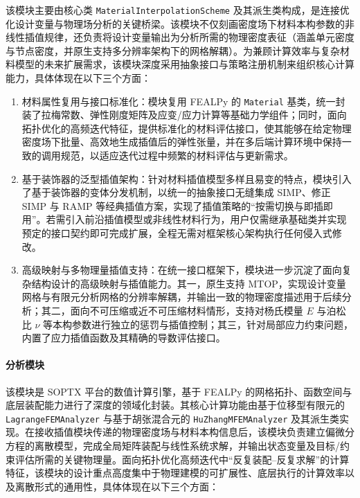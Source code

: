 该模块主要由核心类 \texttt{MaterialInterpolationScheme} 及其派生类构成，是连接优化设计变量与物理场分析的关键桥梁。该模块不仅刻画密度场下材料本构参数的非线性插值规律，还负责将设计变量输出为分析所需的物理密度表征（涵盖单元密度与节点密度，并原生支持多分辨率架构下的网格解耦）。为兼顾计算效率与复杂材料模型的未来扩展需求，该模块深度采用抽象接口与策略注册机制来组织核心计算能力，具体体现在以下三个方面：

\begin{enumerate}
	\item 材料属性复用与接口标准化：模块复用 FEALPy 的 \texttt{Material} 基类，统一封装了拉梅常数、弹性刚度矩阵及应变/应力计算等基础力学组件；同时，面向拓扑优化的高频迭代特征，提供标准化的材料评估接口，使其能够在给定物理密度场下批量、高效地生成插值后的弹性张量，并在多后端计算环境中保持一致的调用规范，以适应迭代过程中频繁的材料评估与更新需求。
	
	\item 基于装饰器的泛型插值架构：针对材料插值模型多样且易变的特点，模块引入了基于装饰器的变体分发机制，以统一的抽象接口无缝集成 SIMP、修正 SIMP 与 RAMP 等经典插值方案，实现了插值策略的“按需切换与即插即用”。若需引入前沿插值模型或非线性材料行为，用户仅需继承基础类并实现预定的接口契约即可完成扩展，全程无需对框架核心架构执行任何侵入式修改。

	\item 高级映射与多物理量插值支持：在统一接口框架下，模块进一步沉淀了面向复杂结构设计的高级映射与插值能力。其一，原生支持 MTOP，实现设计变量网格与有限元分析网格的分辨率解耦，并输出一致的物理密度描述用于后续分析；其二，面向不可压缩或近不可压缩材料情形，支持对杨氏模量 $E$ 与泊松比 $\nu$ 等本构参数进行独立的惩罚与插值控制；其三，针对局部应力约束问题，内置了应力插值函数及其精确的导数评估接口。
\end{enumerate}

\paragraph*{分析模块}

该模块是 SOPTX 平台的数值计算引擎，基于 FEALPy 的网格拓扑、函数空间与底层装配能力进行了深度的领域化封装。其核心计算功能由基于位移型有限元的 \texttt{LagrangeFEMAnalyzer} 与基于胡张混合元的 \texttt{HuZhangMFEMAnalyzer} 及其派生类实现。在接收插值模块传递的物理密度场与材料本构信息后，该模块负责建立偏微分方程的离散模型，完成全局矩阵装配与线性系统求解，并输出状态变量及目标/约束评估所需的关键物理量。面向拓扑优化高频迭代中“反复装配--反复求解”的计算特征，该模块的设计重点高度集中于物理建模的可扩展性、底层执行的计算效率以及离散形式的通用性，具体体现在以下三个方面：

